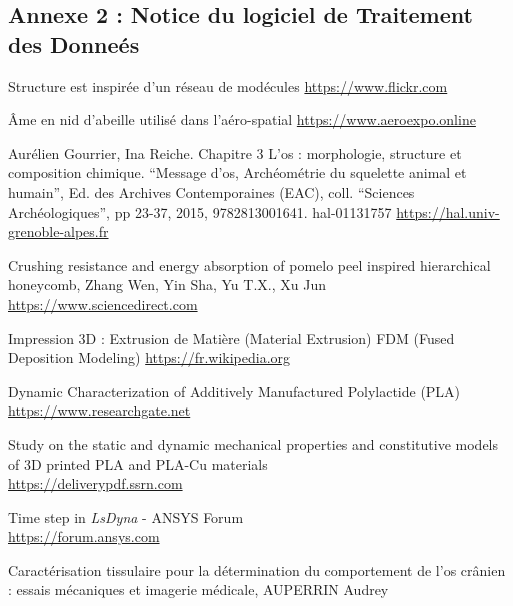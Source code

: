\documentclass[a4paper]{article}
\begin{document}
	
	\subsection{Annexe 2 : Notice du logiciel de Traitement des Donneés}
	\label{annexe2}
	
	\newpage
	
	\cleardoublepage
	\begin{thebibliography}{9}
		Structure est inspirée d'un réseau de modécules
		\href{https://www.flickr.com/photos/jonolist/3323526494}{https://www.flickr.com}
		
		Âme en nid d'abeille utilisé dans l'aéro-spatial
		\href{https://www.aeroexpo.online/fr/prod/toray-advanced-composites/product-172149-61191.html}{https://www.aeroexpo.online}
		
		Aurélien Gourrier, Ina Reiche. Chapitre 3 L’os : morphologie, structure et composition chimique. “Message d’os, Archéométrie du squelette animal et humain”, Ed. des Archives Contemporaines
		(EAC), coll. “Sciences Archéologiques”, pp 23-37, 2015, 9782813001641. hal-01131757
		\href{https://hal.univ-grenoble-alpes.fr/hal-01131757/file/Chap03_Hall.pdf}{https://hal.univ-grenoble-alpes.fr}
		
		Crushing resistance and energy absorption of pomelo peel inspired hierarchical honeycomb, Zhang Wen, Yin Sha, Yu T.X., Xu Jun
		\href{https://www.sciencedirect.com/science/article/abs/pii/S0734743X1830633X}{https://www.sciencedirect.com}
		
		Impression 3D : Extrusion de Matière (Material Extrusion) FDM (Fused Deposition Modeling)
		\href{https://fr.wikipedia.org/wiki/Impression_3D#FDM_(Fused_Deposition_Modeling)}{https://fr.wikipedia.org}
		
		Dynamic Characterization of Additively Manufactured Polylactide (PLA)\\
		\href{https://www.researchgate.net/publication/357340590_Dynamic_Characterization_of_Additively_Manufactured_Polylactide_PLA}{https://www.researchgate.net}
		
		Study on the static and dynamic mechanical properties and constitutive models of 3D printed PLA and PLA-Cu materials\\
		\href{https://deliverypdf.ssrn.com/delivery.php?ID=116093024026078112087086014071000018025036007092012071117040062113114125006073000082087084124008071071106092083089084106089112022084021086019038002106071089091118068093109064000100076075000008015046108025061089024124023099097096109019108127110120118076106116065066001117066080116076008065091&EXT=pdf}{https://deliverypdf.ssrn.com}
		
		Time step in \textit{LsDyna} - ANSYS Forum\\
		\href{https://forum.ansys.com/forums/topic/maximum-time-step/}{https://forum.ansys.com}
		
		Caractérisation tissulaire pour la détermination du comportement de l'os crânien : essais mécaniques et imagerie médicale, AUPERRIN Audrey\\
	\end{thebibliography}
\end{document}
